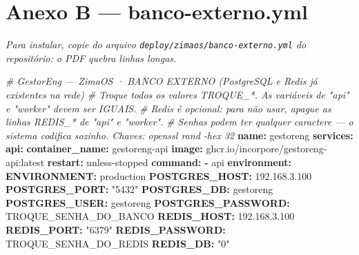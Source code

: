 \documentclass[
  10pt,
]{article}
\newenvironment{Shaded}{\begin{snugshade}}{\end{snugshade}}
\newcommand{\AttributeTok}[1]{\textcolor[rgb]{0.13,0.29,0.53}{#1}}
\newcommand{\CommentTok}[1]{\textcolor[rgb]{0.56,0.35,0.01}{\textit{#1}}}
\newcommand{\FloatTok}[1]{\textcolor[rgb]{0.00,0.00,0.81}{#1}}
\newcommand{\FunctionTok}[1]{\textcolor[rgb]{0.13,0.29,0.53}{\textbf{#1}}}
\newcommand{\KeywordTok}[1]{\textcolor[rgb]{0.13,0.29,0.53}{\textbf{#1}}}
\newcommand{\StringTok}[1]{\textcolor[rgb]{0.31,0.60,0.02}{#1}}
\renewenvironment{quote}{\begin{oldquote}\small\itshape}{\end{oldquote}}
\begin{document}
\hypertarget{anexo-b-banco-externo.yml}{%
\section{Anexo B ---
banco-externo.yml}\label{anexo-b-banco-externo.yml}}

\begin{quote}
Para instalar, copie do arquivo \texttt{deploy/zimaos/banco-externo.yml}
do repositório: o PDF quebra linhas longas.
\end{quote}

\begin{Shaded}
\begin{Highlighting}[]
\CommentTok{\# GestorEng — ZimaOS · BANCO EXTERNO (PostgreSQL e Redis já existentes na rede)}
\CommentTok{\# Troque todos os valores TROQUE\_*. As variáveis de "api" e "worker" devem ser IGUAIS.}
\CommentTok{\# Redis é opcional: para não usar, apague as linhas REDIS\_* de "api" e "worker".}
\CommentTok{\# Senhas podem ter qualquer caractere — o sistema codifica sozinho. Chaves: openssl rand {-}hex 32}
\FunctionTok{name}\KeywordTok{:}\AttributeTok{ gestoreng}
\FunctionTok{services}\KeywordTok{:}
\AttributeTok{  }\FunctionTok{api}\KeywordTok{:}
\AttributeTok{    }\FunctionTok{container\_name}\KeywordTok{:}\AttributeTok{ gestoreng{-}api}
\AttributeTok{    }\FunctionTok{image}\KeywordTok{:}\AttributeTok{ ghcr.io/incorpore/gestoreng{-}api:latest}
\AttributeTok{    }\FunctionTok{restart}\KeywordTok{:}\AttributeTok{ unless{-}stopped}
\AttributeTok{    }\FunctionTok{command}\KeywordTok{:}
\AttributeTok{      }\KeywordTok{{-}}\AttributeTok{ api}
\AttributeTok{    }\FunctionTok{environment}\KeywordTok{:}
\AttributeTok{      }\FunctionTok{ENVIRONMENT}\KeywordTok{:}\AttributeTok{ production}
\AttributeTok{      }\FunctionTok{POSTGRES\_HOST}\KeywordTok{:}\AttributeTok{ }\FloatTok{192.168.3.100}
\AttributeTok{      }\FunctionTok{POSTGRES\_PORT}\KeywordTok{:}\AttributeTok{ }\StringTok{"5432"}
\AttributeTok{      }\FunctionTok{POSTGRES\_DB}\KeywordTok{:}\AttributeTok{ gestoreng}
\AttributeTok{      }\FunctionTok{POSTGRES\_USER}\KeywordTok{:}\AttributeTok{ gestoreng}
\AttributeTok{      }\FunctionTok{POSTGRES\_PASSWORD}\KeywordTok{:}\AttributeTok{ TROQUE\_SENHA\_DO\_BANCO}
\AttributeTok{      }\FunctionTok{REDIS\_HOST}\KeywordTok{:}\AttributeTok{ }\FloatTok{192.168.3.100}
\AttributeTok{      }\FunctionTok{REDIS\_PORT}\KeywordTok{:}\AttributeTok{ }\StringTok{"6379"}
\AttributeTok{      }\FunctionTok{REDIS\_PASSWORD}\KeywordTok{:}\AttributeTok{ TROQUE\_SENHA\_DO\_REDIS}
\AttributeTok{      }\FunctionTok{REDIS\_DB}\KeywordTok{:}\AttributeTok{ }\StringTok{"0"}

\end{Highlighting}
\end{Shaded}
\end{document}
